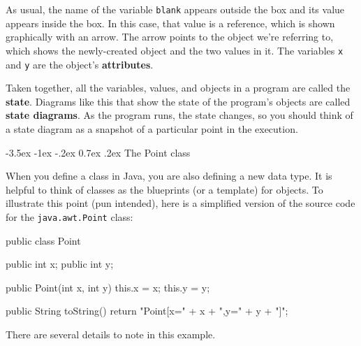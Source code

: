 \documentclass[12pt]{book}
\makeatletter
\theoremstyle{exercise}
\newcommand{\java}[1]{\verb"#1"}
\renewcommand{\section}{\@startsection {section}{1}{\z@}%
    {-3.5ex \@plus -1ex \@minus -.2ex}%
    {0.7ex \@plus.2ex}%
    {\normalfont\Large\bfseries}}
\newcommand{\java}[1]{\lstinline{#1}} %
\makeatother
\begin{document}

As usual, the name of the variable \java{blank} appears outside the box and its value appears inside the box.
In this case, that value is a reference, which is shown graphically with an arrow.
The arrow points to the object we're referring to, which shows the newly-created object and the two values in it.
The variables \java{x} and \java{y} are the object's {\bf attributes}.



Taken together, all the variables, values, and objects in a program are called the {\bf state}.
Diagrams like this that show the state of the program's objects are called {\bf state diagrams}.
As the program runs, the state changes, so you should think of a state diagram as a snapshot of a particular point in the execution.


\section{The Point class}

When you define a class in Java, you are also defining a new data type.
It is helpful to think of classes as the blueprints (or a template) for objects.
To illustrate this point (pun intended), here is a simplified version of the source code for the \java{java.awt.Point} class:

\begin{code}
public class Point {

    public int x;
    public int y;

    public Point(int x, int y) {
        this.x = x;
        this.y = y;
    }

    public String toString() {
        return "Point[x=" + x + ",y=" + y + "]";
    }

}
\end{code}

There are several details to note in this example.
\end{document}
